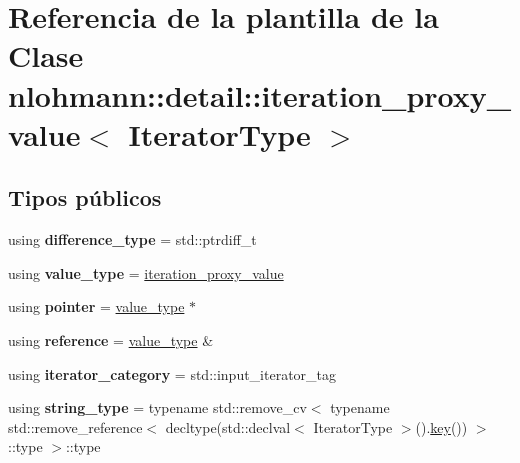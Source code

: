 \hypertarget{classnlohmann_1_1detail_1_1iteration__proxy__value}{}\section{Referencia de la plantilla de la Clase nlohmann\+:\+:detail\+:\+:iteration\+\_\+proxy\+\_\+value$<$ Iterator\+Type $>$}
\label{classnlohmann_1_1detail_1_1iteration__proxy__value}
\subsection*{Tipos públicos}
\begin{DoxyCompactItemize}
\item 
\mbox{\label{classnlohmann_1_1detail_1_1iteration__proxy__value_ada6b4e6d55d8ed7ac79e49a03e9d1fe2}} 
using {\bfseries difference\+\_\+type} = std\+::ptrdiff\+\_\+t
\item 
\mbox{\label{classnlohmann_1_1detail_1_1iteration__proxy__value_a5e90a5810cc1bb6c1000eabbfdfe7b9e}} 
using {\bfseries value\+\_\+type} = \mbox{\hyperlink{classnlohmann_1_1detail_1_1iteration__proxy__value}{iteration\+\_\+proxy\+\_\+value}}
\item 
\mbox{\label{classnlohmann_1_1detail_1_1iteration__proxy__value_a44c64feee85b8e7164a05310e6418a4b}} 
using {\bfseries pointer} = \mbox{\hyperlink{classnlohmann_1_1detail_1_1iteration__proxy__value}{value\+\_\+type}} $\ast$
\item 
\mbox{\label{classnlohmann_1_1detail_1_1iteration__proxy__value_a5bc7d3133daab5ec4797f3132e093af8}} 
using {\bfseries reference} = \mbox{\hyperlink{classnlohmann_1_1detail_1_1iteration__proxy__value}{value\+\_\+type}} \&
\item 
\mbox{\label{classnlohmann_1_1detail_1_1iteration__proxy__value_a1ab8c44e3772c03651b5ad07216043cf}} 
using {\bfseries iterator\+\_\+category} = std\+::input\+\_\+iterator\+\_\+tag
\item 
\mbox{\label{classnlohmann_1_1detail_1_1iteration__proxy__value_a1fc63b88a585fa39942007aab69a74e6}} 
using {\bfseries string\+\_\+type} = typename std\+::remove\+\_\+cv$<$ typename std\+::remove\+\_\+reference$<$ decltype(std\+::declval$<$ Iterator\+Type $>$().\mbox{\hyperlink{classnlohmann_1_1detail_1_1iteration__proxy__value_af2949ac0d70212738030bfda29c5bcc2}{key}}()) $>$\+::type $>$\+::type
\end{DoxyCompactItemize}
